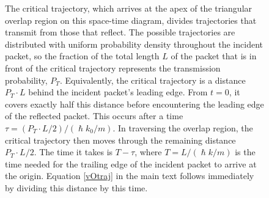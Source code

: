 \documentclass[aps,prc,onecolumn,letterpaper,floatfix,12pt]{revtex4}
\renewcommand{\hbar}{\hslash}
\begin{document}
\begin{figure}[t]
\begin{center}
\caption{
The critical trajectory, which arrives at the apex of the triangular overlap
region on this space-time diagram, 
divides trajectories that transmit from those that reflect.
The possible trajectories are distributed with uniform
probability density throughout the incident packet, so the fraction of
the total length $L$ of the packet that is in front of the critical
trajectory represents the transmission probability, $P_T$.
Equivalently, the critical trajectory is a distance $P_T\cdot L$ behind
the incident packet's leading edge.  From $t=0$, it covers exactly
half this distance before encountering the leading edge of the
reflected packet.  This occurs after a time $\tau = (P_T\cdot L /
2)/(\hbar k_0 / m)$.  In traversing the overlap region, the critical
trajectory then moves through the remaining distance $P_T \cdot L / 2$.
The time it takes is $T - \tau$, where $T = L/(\hbar k / m)$ is the
time needed for the trailing edge of the incident packet to arrive at
the origin.  Equation \eqref{vOtraj} in the main text follows
immediately by dividing this distance by this time.  
\label{fig3}
}
\end{center}
\end{figure}
\end{document}
